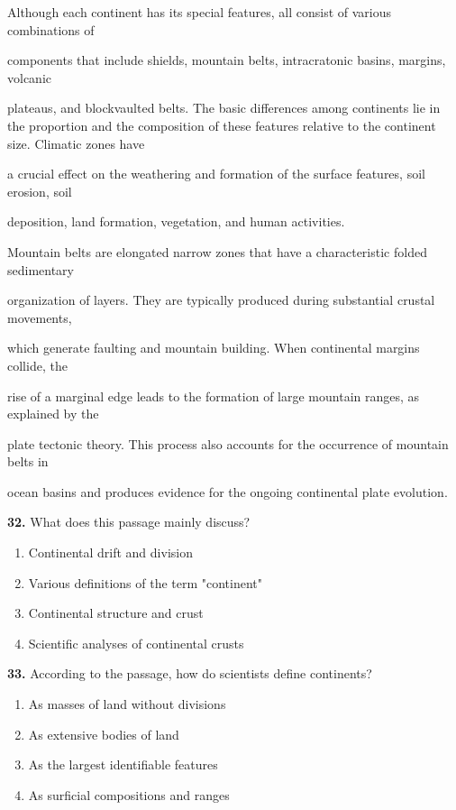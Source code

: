 \documentclass[12pt]{article}
\begin{document}
Although each continent has its special features, all consist of various combinations of\par
components that include shields, mountain belts, intracratonic basins, margins, volcanic\par
plateaus, and blockvaulted belts. The basic differences among continents lie in the proportion and the composition of these features relative to the continent size. Climatic zones have\par
a crucial effect on the weathering and formation of the surface features, soil erosion, soil\par
deposition, land formation, vegetation, and human activities.\par
Mountain belts are elongated narrow zones that have a characteristic folded sedimentary\par
organization of layers. They are typically produced during substantial crustal movements,\par
which generate faulting and mountain building. When continental margins collide, the\par
rise of a marginal edge leads to the formation of large mountain ranges, as explained by the\par
plate tectonic theory. This process also accounts for the occurrence of mountain belts in\par
ocean basins and produces evidence for the ongoing continental plate evolution.\par
\endgroup
\medskip
\noindent\textbf{32.} What does this passage mainly discuss?
\begin{enumerate}[label=(\Alph*),leftmargin=*,itemsep=0.2em]
\item Continental drift and division
\item Various definitions of the term "continent"
\item Continental structure and crust
\item Scientific analyses of continental crusts
\end{enumerate}
\par
\vspace{0.25\baselineskip}
\noindent\textbf{33.} According to the passage, how do scientists define continents?
\begin{enumerate}[label=(\Alph*),leftmargin=*,itemsep=0.2em]
\item As masses of land without divisions
\item As extensive bodies of land
\item As the largest identifiable features
\item As surficial compositions and ranges
\end{enumerate}
\end{document}
